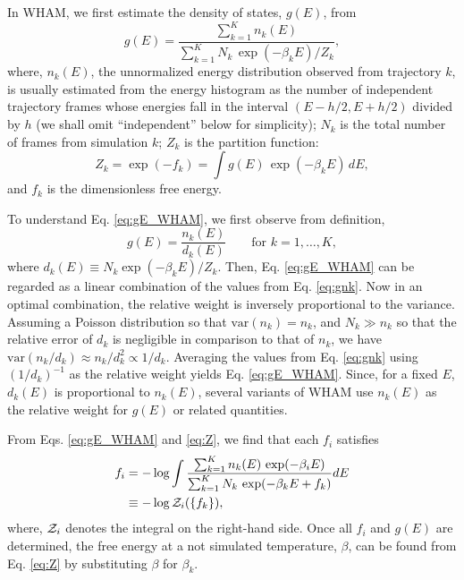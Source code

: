 \documentclass[reprint,aip,jcp,superscriptaddress]{revtex4-1}
\begin{document}
In WHAM,
we first estimate the density of states, $g(E)$, from
%
\begin{equation}
g(E)
=
\frac{
  \sum_{k = 1}^K n_k(E)
}
{
  \sum_{k = 1}^K N_k \, \exp(-\beta_k E) / Z_k
},
\label{eq:gE_WHAM}
\end{equation}
%
where,
$n_k(E)$,
the unnormalized energy distribution
observed from trajectory $k$,
is usually estimated
from the energy histogram as
the number of independent trajectory frames
whose energies fall in the interval
$(E - h/2, E + h/2)$
divided by $h$
(we shall omit ``independent'' below for simplicity);
%
$N_k$
is the total number of frames
from simulation $k$;
%
$Z_k$
is the partition function:
%
\begin{equation}
Z_k
=
\exp( - f_k )
=
\int g(E) \, \exp(-\beta_k E) \, dE,
\label{eq:Z}
\end{equation}
and
$f_k$
is the dimensionless free energy.



To understand Eq. \eqref{eq:gE_WHAM},
we first observe from definition,
%
\begin{equation}
g(E)
=
\frac{ n_k(E) }
     { d_k(E) }
\qquad
\mbox{for $k = 1, \dots, K$},
\label{eq:gnk}
\end{equation}
where $d_k(E) \equiv N_k \exp(-\beta_k E)/Z_k$.
%
Then, Eq. \eqref{eq:gE_WHAM}
can be regarded as
a linear combination
of the values from
Eq. \eqref{eq:gnk}\cite{
roux1995, souaille2001, frenkel}.
%
Now in an optimal combination,
the relative weight is inversely
proportional to the variance.
%
Assuming a Poisson distribution
so that $\mathrm{var}(n_k) = n_k$,
and $N_k \gg n_k$ so that
the relative error of $d_k$ is negligible
in comparison to that of $n_k$,
we have
$\mathrm{var}(n_k/d_k) \approx n_k / d_k^2 \propto 1/d_k$.
%
Averaging the values from Eq. \eqref{eq:gnk}
using $(1/d_k)^{-1}$ as the relative weight yields
Eq. \eqref{eq:gE_WHAM}.
%
Since, for a fixed $E$,
$d_k(E)$ is proportional to $n_k(E)$,
several variants of WHAM use $n_k(E)$
as the relative weight for
$g(E)$\cite{
shen1991}
or related quantities\cite{
woolf1994, *crouzy1994, roux1995,
kastner2005, *kastner2009, kim2011}.
%




From Eqs. \eqref{eq:gE_WHAM} and \eqref{eq:Z},
we find that each $f_i$ satisfies
%
\begin{align}
f_i
&=
-\log
  \int
    \frac{
      \sum_{k = 1}^K n_k(E) \, \exp(-\beta_i E)
    }
    {
      \sum_{k = 1}^K N_k \, \exp(-\beta_k E + f_k)
    }
    dE
\label{eq:f_WHAM}
\\
&\equiv
-\log \mathcal{Z}_i(\{ f_k \}),
\notag
\end{align}
%
where,
$\mathcal{Z}_i$
denotes the integral on the right-hand side.
%
Once all $f_i$ and $g(E)$ are determined,
the free energy at a not simulated temperature, $\beta$,
can be found from Eq. \eqref{eq:Z}
by substituting $\beta$ for $\beta_k$.
\end{document}
